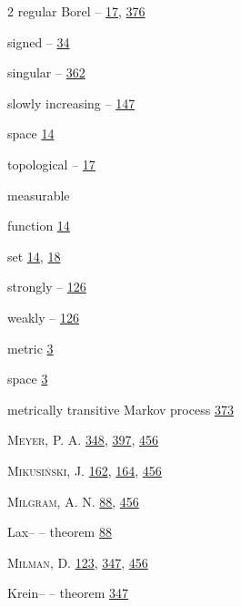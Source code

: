 \begin{multicols}{2}
\hspace*{1.1em}regular Borel -- \hyperlink{page.17}{17}, \hyperlink{page.376}{376}\par
\hspace*{1.1em}signed -- \hyperlink{page.34}{34}\par
\hspace*{1.1em}singular -- \hyperlink{page.362}{362}\par
\hspace*{1.1em}slowly increasing -- \hyperlink{page.147}{147}\par
\hspace*{1.1em}space \hyperlink{page.14}{14}\par
\hspace*{1.1em}topological -- \hyperlink{page.17}{17}\par
\noindent measurable\par
\hspace*{1.1em}function \hyperlink{page.14}{14}\par
\hspace*{1.1em}set \hyperlink{page.14}{14}, \hyperlink{page.18}{18}\par
\hspace*{1.1em}strongly -- \hyperlink{page.126}{126}\par
\hspace*{1.1em}weakly -- \hyperlink{page.126}{126}\par
\noindent metric \hyperlink{page.3}{3}\par
\hspace*{1.1em}space \hyperlink{page.3}{3}\par
\noindent metrically transitive Markov process \hyperlink{page.373}{373}\par
\noindent \textsc{Meyer}, P. A. \hyperlink{page.348}{348}, \hyperlink{page.397}{397}, \hyperlink{page.456}{456}\par
\noindent \textsc{Mikusiński}, J. \hyperlink{page.162}{162}, \hyperlink{page.164}{164}, \hyperlink{page.456}{456}\par
\noindent \textsc{Milgram}, A. N. \hyperlink{page.88}{88}, \hyperlink{page.456}{456}\par
\hspace*{1.1em}Lax-- -- theorem \hyperlink{page.88}{88}\par
\noindent \textsc{Milman}, D. \hyperlink{page.123}{123}, \hyperlink{page.347}{347}, \hyperlink{page.456}{456}\par
\hspace*{1.1em}Krein-- -- theorem \hyperlink{page.347}{347}\par

\end{multicols}
